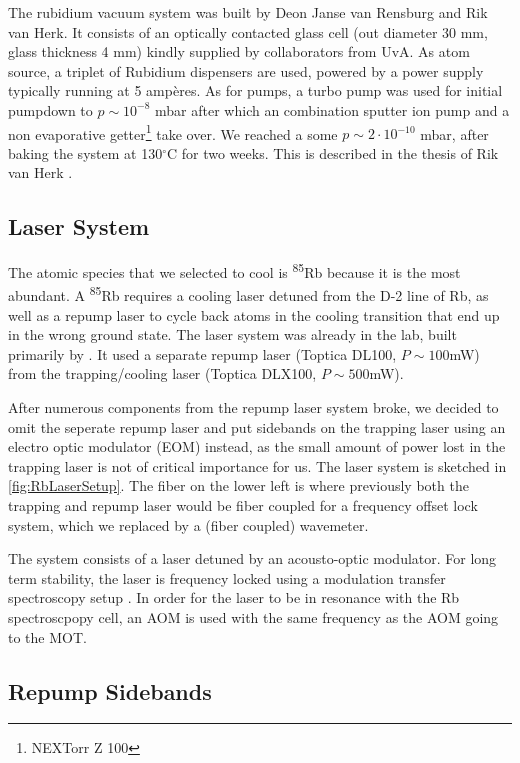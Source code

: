 The rubidium vacuum system was built by Deon Janse van Rensburg and Rik van Herk. It consists of an optically contacted glass cell (out diameter 30 mm, glass thickness 4 mm) kindly supplied by collaborators from UvA. As atom source, a triplet of Rubidium dispensers are used, powered by a power supply typically running at 5 ampères. As for pumps, a turbo pump was used for initial pumpdown to $p\sim 10^{-8}$ mbar after which an combination sputter ion pump and a non evaporative getter\footnote{NEXTorr Z 100} take over. We reached a some $p \sim 2 \cdot 10^{-10}$ mbar, after baking the system at 130${}^{\circ}$C for two weeks. This is described in the thesis of Rik van Herk \cite{Herk2022}.

\subsection{Laser System}

The atomic species that we selected to cool is \textsuperscript{85}Rb because it is the most abundant. A \textsuperscript{85}Rb requires a cooling laser detuned from the D-2 line of Rb, as well as a repump laser to cycle back atoms in the cooling transition that end up in the wrong ground state. The laser system was already in the lab, built primarily by \cite{Reijnders2010}. It used a separate repump laser (Toptica DL100, $P \sim 100$mW) from the trapping/cooling laser (Toptica DLX100, $P \sim 500$mW). 

After numerous components from the repump laser system broke, we decided to omit the seperate repump laser and put sidebands on the trapping laser using an electro optic modulator (EOM) instead, as the small amount of power lost in the trapping laser is not of critical importance for us. The laser system is sketched in \cref{fig:RbLaserSetup}. The fiber on the lower left is where previously both the trapping and repump laser would be fiber coupled for a frequency offset lock system, which we replaced by a (fiber coupled) wavemeter. 

The system consists of a laser detuned by an acousto-optic modulator. For long term stability, the laser is frequency locked using a modulation transfer spectroscopy setup \cite{McCarron2008,Reijnders2010}. In order for the laser to be in resonance with the Rb spectroscpopy cell, an AOM is used with the same frequency as the AOM going to the MOT. 

\subsection{Repump Sidebands}

